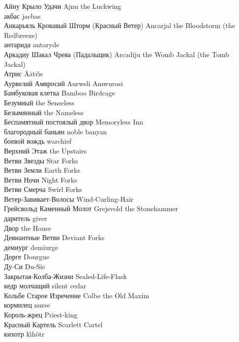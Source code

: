 \documentclass[a4paper,10pt,fleqn]{book}
\begin{document}
Айну Крыло Удачи \hfill Ajnu the Luckwing\\
акбас \hfill jacbas\\
Анкарьяль Кровавый Шторм (Красный Ветер) \hfill Ancarjal the Bloodstorm (the Redbreeze)\\
антарида \hfill antaryde\\
Аркадиу Шакал Чрева (Падальщик) \hfill Arcadiju the Womb Jackal (the Tomb Jackal)\\
Атрис \hfill \"{A}\={a}tr\v{\i}s\\
Аурвелий Амвросий \hfill Aurweli Amwurosi\\
Бамбуковая клетка \hfill Bamboo Birdcage\\
Безумный \hfill the Senseless\\
Безымянный \hfill the Nameless\\
Беспамятный постоялый двор \hfill Memoryless Inn\\
благородный баньян \hfill noble banyan\\
боевой вождь \hfill warchief\\
Верхний Этаж \hfill the Upstairs\\
Ветви Звезды \hfill Star Forks\\
Ветви Земли \hfill Earth Forks\\
Ветви Ночи \hfill Night Forks\\
Ветви Смерча \hfill Swirl Forks\\
Ветер-Завивает-Волосы \hfill Wind-Curling-Hair\\
Грейсвольд Каменный Молот \hfill Grejsvold the Stonehammer\\
даритель \hfill giver\\
Двор \hfill the House\\
Девиантные Ветви \hfill Deviant Forks\\
демиург \hfill demiurge\\
Дорге \hfill Dourgue\\
Ду-Си \hfill Du-Sie\\
Закрытая-Колба-Жизни \hfill Sealed-Life-Flask\\
кедр молчащий \hfill silent cedar\\
Кольбе Старое Изречение \hfill Colbe the Old Maxim\\
кормилец \hfill nurse\\
Король-жрец \hfill Priest-king\\
Красный Картель \hfill Scarlett Cartel\\
кихотр \hfill k\^{\i}h\~{o}tr\\
\end{document}
